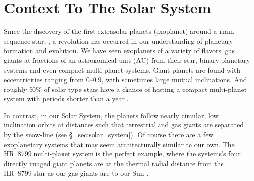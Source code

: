 \section{Context To The Solar System}\label{sec:ch1_context}

    Since the discovery of the first extrasolar planets (exoplanet) around a main-sequence star, \citep[HD~114762~b and 51~Pegasi~b,][respectively]{Latham1989, Mayor1995}, a revolution has occurred in our understanding of planetary formation and evolution. We have seen exoplanets of a variety of flavors; gas giants at fractions of an astronomical unit (AU) from their star, binary planetary systems and even compact multi-planet systems. Giant planets are found with eccentricities ranging from 0--0.9, with sometimes large mutual inclinations. And roughly 50\% of solar type stars have a chance of hosting a compact multi-planet system with periods shorter than a year \citep[see review by][]{Winn2015}. 
    
    In contrast, in our Solar System, the planets follow nearly circular, low inclination orbits at distances such that terrestrial and gas giants are separated by the snow-line (see \S~\ref{sec:solar_system}). Of course there are a few exoplanetary systems that may seem architecturally similar to our own. The HR~8799 multi-planet system is the perfect example, where the systems's four directly imaged giant planets are at the thermal radial distance from the HR~8799 star as our gas giants are to our Sun \citep{Marois2010}. 
    

